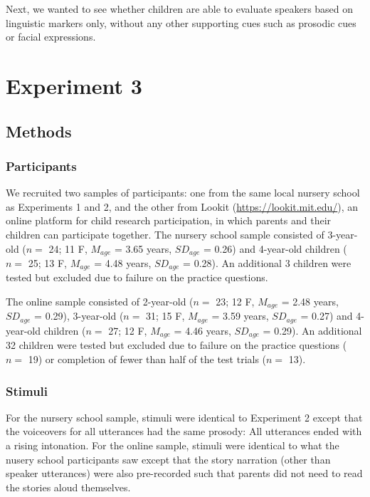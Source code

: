 \documentclass[10pt, letterpaper]{article}
\begin{document}
Next, we wanted to see whether children are able to evaluate speakers
based on linguistic markers only, without any other supporting cues such
as prosodic cues or facial expressions.

\section{Experiment 3}\label{experiment-3}

\subsection{Methods}\label{methods-2}

\subsubsection{Participants}\label{participants-2}

We recruited two samples of participants: one from the same local
nursery school as Experiments 1 and 2, and the other from Lookit
(\url{https://lookit.mit.edu/}), an online platform for child research
participation, in which parents and their children can participate
together. The nursery school sample consisted of 3-year-old (\(n=\) 24;
11 F, \(M_{age}\) = 3.65 years, \(SD_{age}\) = 0.26) and 4-year-old
children (\(n=\) 25; 13 F, \(M_{age}\) = 4.48 years, \(SD_{age}\) =
0.28). An additional 3 children were tested but excluded due to failure
on the practice questions.

The online sample consisted of 2-year-old (\(n=\) 23; 12 F, \(M_{age}\)
= 2.48 years, \(SD_{age}\) = 0.29), 3-year-old (\(n=\) 31; 15 F,
\(M_{age}\) = 3.59 years, \(SD_{age}\) = 0.27) and 4-year-old children
(\(n=\) 27; 12 F, \(M_{age}\) = 4.46 years, \(SD_{age}\) = 0.29). An
additional 32 children were tested but excluded due to failure on the
practice questions (\(n=\) 19) or completion of fewer than half of the
test trials (\(n=\) 13).

\subsubsection{Stimuli}\label{stimuli}

For the nursery school sample, stimuli were identical to Experiment 2
except that the voiceovers for all utterances had the same prosody: All
utterances ended with a rising intonation. For the online sample,
stimuli were identical to what the nusery school participants saw except
that the story narration (other than speaker utterances) were also
pre-recorded such that parents did not need to read the stories aloud
themselves.
\end{document}
